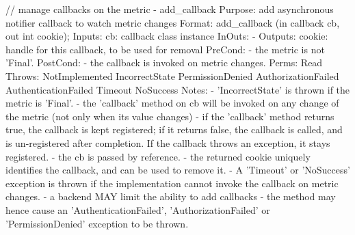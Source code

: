 \begin{myspec}
 
    // manage callbacks on the metric
    - add_callback
      Purpose:  add asynchronous notifier callback to watch
                metric changes
      Format:   add_callback       (in  callback cb,
                                    out int      cookie);
      Inputs:   cb:                 callback class instance
      InOuts:   -
      Outputs:  cookie:             handle for this callback,
                                    to be used for removal
      PreCond:  - the metric is not 'Final'.
      PostCond: - the callback is invoked on metric changes.
      Perms:    Read
      Throws:   NotImplemented
                IncorrectState
                PermissionDenied
                AuthorizationFailed
                AuthenticationFailed
                Timeout
                NoSuccess
      Notes:    - 'IncorrectState' is thrown if the metric is 
                  'Final'.
                - the 'callback' method on cb will be invoked on
                  any change of the metric (not only when its
                  value changes)
                - if the 'callback' method returns true, the
                  callback is kept registered; if it returns
                  false, the callback is called, and is
                  un-registered after completion.  If the
                  callback throws an exception, it stays
                  registered.
                - the cb is passed by reference.
                - the returned cookie uniquely identifies the
                  callback, and can be used to remove it.
                - A 'Timeout' or 'NoSuccess' exception is thrown
                  if the implementation cannot invoke the 
                  callback on metric changes.
                - a backend MAY limit the ability to add
                  callbacks - the method may hence cause an 
                  'AuthenticationFailed', 'AuthorizationFailed'
                  or 'PermissionDenied' exception to be thrown.
                

\end{myspec}
